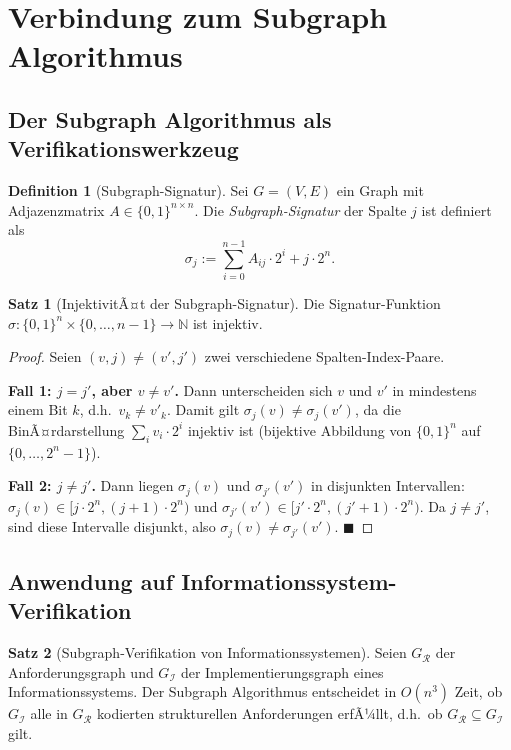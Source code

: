 ﻿\documentclass[a4paper,12pt]{article}
\theoremstyle{definition}
\newtheorem{definition}{Definition}
\newtheorem{satz}{Satz}
\begin{document}
\section{Verbindung zum Subgraph Algorithmus}
\label{sec:subgraph}

\subsection{Der Subgraph Algorithmus als Verifikationswerkzeug}

\begin{definition}[Subgraph-Signatur]
\label{def:sigsub}
Sei $G = (V, E)$ ein Graph mit Adjazenzmatrix $A \in \{0,1\}^{n \times n}$.
Die \emph{Subgraph-Signatur} der Spalte $j$ ist definiert als
\[
  \sigma_j := \sum_{i=0}^{n-1} A_{ij} \cdot 2^i + j \cdot 2^n.
\]
\end{definition}

\begin{satz}[InjektivitÃ¤t der Subgraph-Signatur]
\label{satz:injektiv}
Die Signatur-Funktion $\sigma: \{0,1\}^n \times \{0,\ldots,n-1\} \to \mathbb{N}$
ist injektiv.
\end{satz}

\begin{proof}
Seien $(v, j) \neq (v', j')$ zwei verschiedene Spalten-Index-Paare.

\textbf{Fall 1: $j = j'$, aber $v \neq v'$.}
Dann unterscheiden sich $v$ und $v'$ in mindestens einem Bit $k$, d.h.\ $v_k \neq v'_k$.
Damit gilt $\sigma_j(v) \neq \sigma_j(v')$, da die BinÃ¤rdarstellung $\sum_i v_i \cdot 2^i$
injektiv ist (bijektive Abbildung von $\{0,1\}^n$ auf $\{0,\ldots,2^n-1\}$).

\textbf{Fall 2: $j \neq j'$.}
Dann liegen $\sigma_j(v)$ und $\sigma_{j'}(v')$ in disjunkten Intervallen:
$\sigma_j(v) \in [j \cdot 2^n, (j+1) \cdot 2^n)$ und
$\sigma_{j'}(v') \in [j' \cdot 2^n, (j'+1) \cdot 2^n)$.
Da $j \neq j'$, sind diese Intervalle disjunkt, also $\sigma_j(v) \neq \sigma_{j'}(v')$. $\blacksquare$
\end{proof}

\subsection{Anwendung auf Informationssystem-Verifikation}

\begin{satz}[Subgraph-Verifikation von Informationssystemen]
\label{satz:subgraphverif}
Seien $G_\mathcal{R}$ der Anforderungsgraph und $G_\mathcal{I}$ der Implementierungsgraph
eines Informationssystems. Der Subgraph Algorithmus entscheidet in $O(n^3)$ Zeit, ob
$G_\mathcal{I}$ alle in $G_\mathcal{R}$ kodierten strukturellen Anforderungen erfÃ¼llt,
d.h.\ ob $G_\mathcal{R} \subseteq G_\mathcal{I}$ gilt.
\end{satz}
\end{document}
